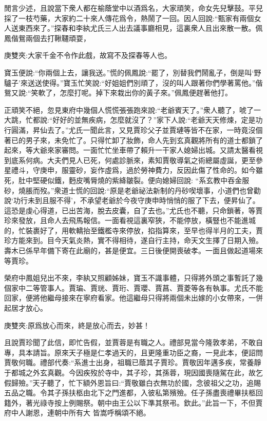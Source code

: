 \begin{parag}
    閒言少述，且說當下衆人都在榆蔭堂中以酒爲名，大家頑笑，命女先兒擊鼓。平兒採了一枝芍藥，大家約二十來人傳花爲令，熱鬧了一回。因人回說:“甄家有兩個女人送東西來了。”探春和李紈尤氏三人出去議事廳相見，這裏衆人且出來散一散。佩鳳偕鴛兩個去打鞦韆頑耍，\begin{note}庚雙夾:大家千金不令作此戲，故寫不及探春等人也。\end{note}寶玉便說:“你兩個上去，讓我送。”慌的佩鳳說:“罷了，別替我們鬧亂子，倒是叫‘野驢子’來送送使得。”寶玉忙笑說:“好姐姐們別頑了，沒的叫人跟著你們學著罵他。”偕鴛又說:“笑軟了，怎麼打呢。掉下來栽出你的黃子來。”佩鳳便趕著他打。
\end{parag}


\begin{parag}
    正頑笑不絕，忽見東府中幾個人慌慌張張跑來說:“老爺賓天了。”衆人聽了，唬了一大跳，忙都說:“好好的並無疾病，怎麼就沒了？”家下人說:“老爺天天修煉，定是功行圓滿，昇仙去了。”尤氏一聞此言，又見賈珍父子並賈璉等皆不在家，一時竟沒個著已的男子來，未免忙了。只得忙卸了妝飾，命人先到玄真觀將所有的道士都鎖了起來，等大爺來家審問。一面忙忙坐車帶了賴升一干家人媳婦出城。又請太醫看視到底系何病。大夫們見人已死，何處診脈來，素知賈敬導氣之術總屬虛誕，更至參星禮斗，守庚申，服靈砂，妄作虛爲，過於勞神費力，反因此傷了性命的。如今雖死，肚中堅硬似鐵，麪皮嘴脣燒的紫絳皺裂。便向媳婦回說: “系玄教中吞金服砂，燒脹而歿。”衆道士慌的回說:“原是老爺祕法新制的丹砂喫壞事，小道們也曾勸說‘功行未到且服不得’，不承望老爺於今夜守庚申時悄悄的服了下去，便昇仙了。這恐是虔心得道，已出苦海，脫去皮囊，自了去也。”尤氏也不聽，只命鎖著，等賈珍來發放，且命人去飛馬報信。一面看視這裏窄狹，不能停放，橫豎也不能進城的，忙裝裹好了，用軟轎抬至鐵檻寺來停放，掐指算來，至早也得半月的工夫，賈珍方能來到。目今天氣炎熱，實不得相待，遂自行主持，命天文生擇了日期入殮。壽木已係早年備下寄在此廟的，甚是便宜。三日後便開喪破孝。一面且做起道場來等賈珍。
\end{parag}


\begin{parag}
    榮府中鳳姐兒出不來，李紈又照顧姊妹，寶玉不識事體，只得將外頭之事暫託了幾個家中二等管事人。賈㻞、賈珖、賈珩、賈瓔、賈菖、賈菱等各有執事。尤氏不能回家，便將他繼母接來在寧府看家。他這繼母只得將兩個未出嫁的小女帶來，一併起居才放心。\begin{note}庚雙夾:原爲放心而來，終是放心而去，妙甚！\end{note}
\end{parag}


\begin{parag}
    且說賈珍聞了此信，即忙告假，並賈蓉是有職之人。禮部見當今隆敦孝弟，不敢自專，具本請旨。原來天子極是仁孝過天的，且更隆重功臣之裔，一見此本，便詔問賈敬何職。禮部代奏:“系進士出身，祖職已蔭其子賈珍。賈敬因年邁多疾，常養靜于都城之外玄真觀。今因疾歿於寺中，其子珍，其孫蓉，現因國喪隨駕在此，故乞假歸殮。”天子聽了，忙下額外恩旨曰:“賈敬雖白衣無功於國，念彼祖父之功，追賜五品之職。令其子孫扶柩由北下之門進都，入彼私第殯殮。任子孫盡喪禮畢扶柩回籍外，著光祿寺按上例賜祭。朝中由王公以下準其祭弔。欽此。”此旨一下，不但賈府中人謝恩，連朝中所有大 皆嵩呼稱頌不絕。
\end{parag}


